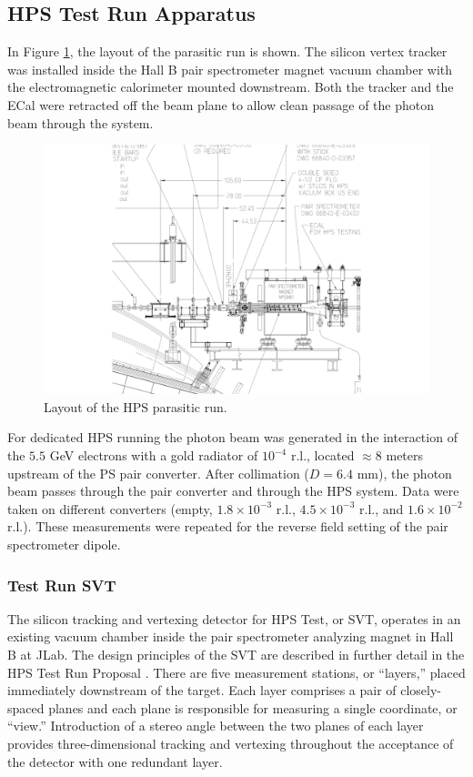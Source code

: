 \subsection{HPS Test Run Apparatus } 

In Figure \ref{fig:hpstest_layout}, the layout of the parasitic run is shown. The silicon vertex tracker was installed inside the Hall B pair spectrometer magnet vacuum chamber with the electromagnetic calorimeter mounted downstream.
Both the tracker and the ECal were retracted off the beam plane to allow clean passage of the photon beam through the system.
 
\begin{figure}[ht]
    \includegraphics[width=\textwidth]{test2012/HPS_dimensions}
\caption{\small{Layout of the HPS parasitic run.} }
\label{fig:hpstest_layout}
\end{figure}

For dedicated HPS running the photon beam was generated in the interaction of the $5.5$ GeV electrons with a gold radiator of $10^{-4}$ r.l., located $\approx 8$ meters upstream of the PS pair converter. After collimation ($D=6.4$ mm), the photon beam passes through the pair converter and through the HPS system. Data were taken on different converters (empty, $1.8\times 10^{-3}$ r.l., $4.5\times 10^{-3}$ r.l., and $1.6\times 10^{-2}$ r.l.). These measurements were repeated for the reverse field setting of the pair spectrometer dipole.

\subsubsection{Test Run SVT}

The silicon tracking and vertexing detector for HPS Test, or SVT, operates in an existing vacuum chamber inside the pair spectrometer analyzing magnet in Hall B at JLab.  The design principles of the SVT are described in further detail in the HPS Test Run Proposal  \cite{HPS_tPROP}. There are five measurement stations, or ``layers,'' placed immediately downstream of the target. Each layer comprises a pair of closely-spaced planes and each plane is responsible for measuring a single coordinate, or ``view.'' Introduction of a stereo angle between the two planes of each layer provides three-dimensional tracking and vertexing throughout the acceptance of the detector with one redundant layer. 

